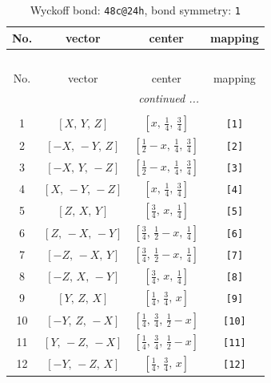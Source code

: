 \documentclass[fleqn,8pt]{jsarticle}
\begin{document}
\begin{longtable}{cccc}
\caption{Wyckoff bond: {\tt 48c@24h}, bond symmetry: {\tt 1}}
 \\
 \hline \hline
No. & vector & center & mapping \\ \hline \endfirsthead

\multicolumn{3}{l}{\tablename\ \thetable{}} \\
 \hline \hline
No. & vector & center & mapping \\ \hline \endhead

 \hline \hline
\multicolumn{3}{r}{\footnotesize\it continued ...} \\ \endfoot

 \hline \hline
\multicolumn{3}{r}{} \\ \endlastfoot

1 & $\left[ X,\, Y,\, Z \right]$ & $\left[ x,\, \frac{1}{4},\, \frac{3}{4} \right]$ & {\tt [1]} \\ \hline
2 & $\left[ - X,\, - Y,\, Z \right]$ & $\left[ \frac{1}{2} - x,\, \frac{1}{4},\, \frac{3}{4} \right]$ & {\tt [2]} \\ \hline
3 & $\left[ - X,\, Y,\, - Z \right]$ & $\left[ \frac{1}{2} - x,\, \frac{1}{4},\, \frac{3}{4} \right]$ & {\tt [3]} \\ \hline
4 & $\left[ X,\, - Y,\, - Z \right]$ & $\left[ x,\, \frac{1}{4},\, \frac{3}{4} \right]$ & {\tt [4]} \\ \hline
5 & $\left[ Z,\, X,\, Y \right]$ & $\left[ \frac{3}{4},\, x,\, \frac{1}{4} \right]$ & {\tt [5]} \\ \hline
6 & $\left[ Z,\, - X,\, - Y \right]$ & $\left[ \frac{3}{4},\, \frac{1}{2} - x,\, \frac{1}{4} \right]$ & {\tt [6]} \\ \hline
7 & $\left[ - Z,\, - X,\, Y \right]$ & $\left[ \frac{3}{4},\, \frac{1}{2} - x,\, \frac{1}{4} \right]$ & {\tt [7]} \\ \hline
8 & $\left[ - Z,\, X,\, - Y \right]$ & $\left[ \frac{3}{4},\, x,\, \frac{1}{4} \right]$ & {\tt [8]} \\ \hline
9 & $\left[ Y,\, Z,\, X \right]$ & $\left[ \frac{1}{4},\, \frac{3}{4},\, x \right]$ & {\tt [9]} \\ \hline
10 & $\left[ - Y,\, Z,\, - X \right]$ & $\left[ \frac{1}{4},\, \frac{3}{4},\, \frac{1}{2} - x \right]$ & {\tt [10]} \\ \hline
11 & $\left[ Y,\, - Z,\, - X \right]$ & $\left[ \frac{1}{4},\, \frac{3}{4},\, \frac{1}{2} - x \right]$ & {\tt [11]} \\ \hline
12 & $\left[ - Y,\, - Z,\, X \right]$ & $\left[ \frac{1}{4},\, \frac{3}{4},\, x \right]$ & {\tt [12]} \\ \hline

\end{longtable}
\end{document}
